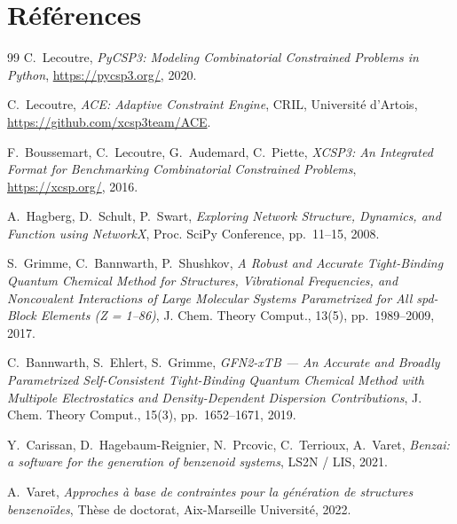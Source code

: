 \section*{Références}

\begin{thebibliography}{99}
    C.~Lecoutre, \textit{PyCSP3: Modeling Combinatorial Constrained Problems in Python},
    \url{https://pycsp3.org/}, 2020.

    C.~Lecoutre, \textit{ACE: Adaptive Constraint Engine},
    CRIL, Université d'Artois,
    \url{https://github.com/xcsp3team/ACE}.

    F.~Boussemart, C.~Lecoutre, G.~Audemard, C.~Piette,
    \textit{XCSP3: An Integrated Format for Benchmarking Combinatorial Constrained Problems},
    \url{https://xcsp.org/}, 2016.

    A.~Hagberg, D.~Schult, P.~Swart,
    \textit{Exploring Network Structure, Dynamics, and Function using NetworkX},
    Proc. SciPy Conference, pp.~11--15, 2008.

    S.~Grimme, C.~Bannwarth, P.~Shushkov,
    \textit{A Robust and Accurate Tight-Binding Quantum Chemical Method for Structures,
    Vibrational Frequencies, and Noncovalent Interactions of Large Molecular Systems
    Parametrized for All spd-Block Elements (Z = 1--86)},
    J. Chem. Theory Comput., 13(5), pp.~1989--2009, 2017.

    C.~Bannwarth, S.~Ehlert, S.~Grimme,
    \textit{GFN2-xTB — An Accurate and Broadly Parametrized Self-Consistent Tight-Binding
    Quantum Chemical Method with Multipole Electrostatics and Density-Dependent Dispersion
    Contributions},
    J. Chem. Theory Comput., 15(3), pp.~1652--1671, 2019.

    Y.~Carissan, D.~Hagebaum-Reignier, N.~Prcovic, C.~Terrioux, A.~Varet,
    \textit{Benzai: a software for the generation of benzenoid systems},
    LS2N / LIS, 2021.

    A.~Varet,
    \textit{Approches à base de contraintes pour la génération de structures benzenoïdes},
    Thèse de doctorat, Aix-Marseille Université, 2022.
\end{thebibliography}
